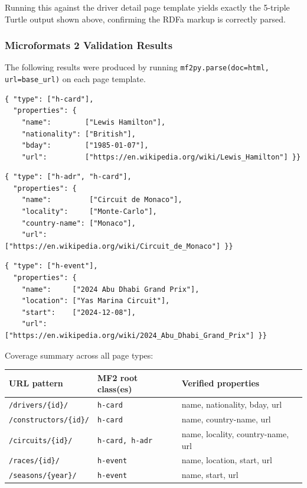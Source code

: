 \documentclass[12pt,a4paper]{article}
\begin{document}
Running this against the driver detail page template yields exactly the 5-triple
Turtle output shown above, confirming the RDFa markup is correctly parsed.

\subsubsection{Microformats 2 Validation Results}

The following results were produced by running \texttt{mf2py.parse(doc=html, url=base\_url)}
on each page template.

\begin{lstlisting}[style=shell, caption={mf2py output for /drivers/1/ --- h-card verified}]
{ "type": ["h-card"],
  "properties": {
    "name":        ["Lewis Hamilton"],
    "nationality": ["British"],
    "bday":        ["1985-01-07"],
    "url":         ["https://en.wikipedia.org/wiki/Lewis_Hamilton"] }}
\end{lstlisting}

\begin{lstlisting}[style=shell, caption={mf2py output for /circuits/6/ --- h-card + h-adr verified}]
{ "type": ["h-adr", "h-card"],
  "properties": {
    "name":         ["Circuit de Monaco"],
    "locality":     ["Monte-Carlo"],
    "country-name": ["Monaco"],
    "url":          ["https://en.wikipedia.org/wiki/Circuit_de_Monaco"] }}
\end{lstlisting}

\begin{lstlisting}[style=shell, caption={mf2py output for /races/1144/ --- h-event verified}]
{ "type": ["h-event"],
  "properties": {
    "name":     ["2024 Abu Dhabi Grand Prix"],
    "location": ["Yas Marina Circuit"],
    "start":    ["2024-12-08"],
    "url":      ["https://en.wikipedia.org/wiki/2024_Abu_Dhabi_Grand_Prix"] }}
\end{lstlisting}

Coverage summary across all page types:

\begin{center}
\begin{tabular}{@{}llp{5cm}@{}}
\toprule
\textbf{URL pattern} & \textbf{MF2 root class(es)} & \textbf{Verified properties} \\
\midrule
\texttt{/drivers/\{id\}/}      & \texttt{h-card}        & name, nationality, bday, url \\
\texttt{/constructors/\{id\}/} & \texttt{h-card}        & name, country-name, url \\
\texttt{/circuits/\{id\}/}     & \texttt{h-card, h-adr} & name, locality, country-name, url \\
\texttt{/races/\{id\}/}        & \texttt{h-event}       & name, location, start, url \\
\texttt{/seasons/\{year\}/}    & \texttt{h-event}       & name, start, url \\
\bottomrule
\end{tabular}
\end{center}
\end{document}
